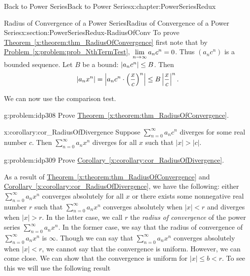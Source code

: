 \begin{chapterptx}{Back to Power Series}{}{Back to Power Series}{}{}{x:chapter:PowerSeriesRedux}
\begin{sectionptx}{Radius of Convergence of a Power Series}{}{Radius of Convergence of a Power Series}{}{}{x:section:PowerSeriesRedux-RadiusOfConv}
		To prove \hyperref[x:theorem:thm_RadiusOfConvergence]{Theorem~{\xreffont\ref{x:theorem:thm_RadiusOfConvergence}}} first note that by \hyperref[x:problem:prob_NthTermTest]{Problem~{\xreffont\ref{x:problem:prob_NthTermTest}}}, \({\displaystyle\lim_{n\rightarrow \infty}a_nc^n}=0\). Thus \(\left(a_nc^n\right)\) is a bounded sequence. Let \(B\) be a bound: \(\left|a_nc^n\right|\le B\). Then%
		\begin{equation*}
			\left|a_nx^n\right|=\left|a_nc^n\cdot\left(\frac{x}{c}\right)^n\right|\leq B\left|\frac{x}{c}\right|^n\text{.}
		\end{equation*}
		\par
		We can now use the comparison test.%
		\begin{problem}{}{g:problem:idp308}%
			 Prove \hyperref[x:theorem:thm_RadiusOfConvergence]{Theorem~{\xreffont\ref{x:theorem:thm_RadiusOfConvergence}}}.%
		\end{problem}
		\begin{corollary}{}{}{x:corollary:cor_RadiusOfDivergence}%
			Suppose \(\sum_{n=0}^\infty a_nc^n\) diverges for some real number \(c\). Then \(\sum_{n=0}^\infty a_nx^n\) diverges for all \(x\) such that \(|x|>|c|\).%
		\end{corollary}
		\begin{problem}{}{g:problem:idp309}%
			 Prove \hyperref[x:corollary:cor_RadiusOfDivergence]{Corollary~{\xreffont\ref{x:corollary:cor_RadiusOfDivergence}}}.%
		\end{problem}
		As a result of \hyperref[x:theorem:thm_RadiusOfConvergence]{Theorem~{\xreffont\ref{x:theorem:thm_RadiusOfConvergence}}} and \hyperref[x:corollary:cor_RadiusOfDivergence]{Corollary~{\xreffont\ref{x:corollary:cor_RadiusOfDivergence}}}, we have the following: either \(\sum_{n=0}^\infty a_nx^n\) converges absolutely for all \(x\) or there exists some nonnegative real number \(r\) such that \(\sum_{n=0}^\infty a_nx^n\) converges absolutely when \(|x|\lt r\) and diverges when \(|x|>r\). In the latter case, we call \(r\) the \emph{radius of convergence} of the power series \(\sum_{n=0}^{\infty}a_{n} x^{n}\). In the former case, we say that the radius of convergence of \(\sum_{n=0}^\infty a_nx^n\) is \(\infty\). Though we can say that \(\sum_{n=0}^\infty a_nx^n\) converges absolutely when \(|x|\lt r\), we cannot say that the convergence is uniform. However, we can come close. We can show that the convergence is uniform for \(|x|\leq b\lt r\). To see this we will use the following result%

\end{sectionptx}
\end{chapterptx}
